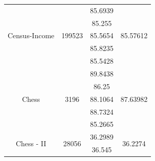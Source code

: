 \documentclass[12pt]{article}
\begin{document}
\begin{table}[]
\begin{tabular}{|c|c|c|c|}
		\multirow{5}{*}{Census-Income}       & \multirow{5}{*}{199523} & 85.6939                                                                                          & \multirow{5}{*}{85.57612}   \\ \cline{3-3}
		&                         & 85.255                                                                                           &                             \\ \cline{3-3}
		&                         & 85.5654                                                                                          &                             \\ \cline{3-3}
		&                         & 85.8235                                                                                          &                             \\ \cline{3-3}
		&                         & 85.5428                                                                                          &                             \\ \hline
		\multirow{5}{*}{Chess}               & \multirow{5}{*}{3196}   & 89.8438                                                                                          & \multirow{5}{*}{87.63982}   \\ \cline{3-3}
		&                         & 86.25                                                                                            &                             \\ \cline{3-3}
		&                         & 88.1064                                                                                          &                             \\ \cline{3-3}
		&                         & 88.7324                                                                                          &                             \\ \cline{3-3}
		&                         & 85.2665                                                                                          &                             \\ \hline
		\multirow{5}{*}{Chess - II}          & \multirow{5}{*}{28056}  & 36.2989                                                                                          & \multirow{5}{*}{36.2274}    \\ \cline{3-3}
		&                         & 36.545                                                                                           &                             \\ \cline{3-3}

\end{tabular}
\end{table}
\end{document}
